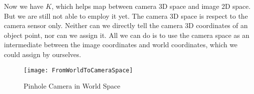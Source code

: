 
Now we have \(K\), which helps map between camera 3D space and image 2D space. But we are still not able to employ it yet. The camera 3D space is respect to the camera sensor only. Neither can we directly tell the camera 3D coordinates of an object point, nor can we assign it. All we can do is to use the camera space as an intermediate between the image coordinates and world coordinates, which we could assign by ourselves.
%
\begin{figure}[!t]
\centering
\texttt{[image: FromWorldToCameraSpace]}
\caption{Pinhole Camera in World Space}
\label{FromWorldToCameraSpace}
\end{figure}%
%

